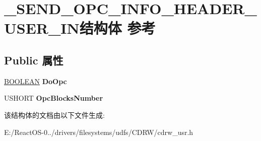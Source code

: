 \hypertarget{struct___s_e_n_d___o_p_c___i_n_f_o___h_e_a_d_e_r___u_s_e_r___i_n}{}\section{\+\_\+\+S\+E\+N\+D\+\_\+\+O\+P\+C\+\_\+\+I\+N\+F\+O\+\_\+\+H\+E\+A\+D\+E\+R\+\_\+\+U\+S\+E\+R\+\_\+\+I\+N结构体 参考}
\label{struct___s_e_n_d___o_p_c___i_n_f_o___h_e_a_d_e_r___u_s_e_r___i_n}
\subsection*{Public 属性}
\begin{DoxyCompactItemize}
\item 
\mbox{\label{struct___s_e_n_d___o_p_c___i_n_f_o___h_e_a_d_e_r___u_s_e_r___i_n_af9e8914b6ea889fdde4a1f03b2f957a3}} 
\hyperlink{_processor_bind_8h_a112e3146cb38b6ee95e64d85842e380a}{B\+O\+O\+L\+E\+AN} {\bfseries Do\+Opc}
\item 
\mbox{\label{struct___s_e_n_d___o_p_c___i_n_f_o___h_e_a_d_e_r___u_s_e_r___i_n_ac4a7e04fad6c379854cb6f25ec1c6852}} 
U\+S\+H\+O\+RT {\bfseries Opc\+Blocks\+Number}
\end{DoxyCompactItemize}


该结构体的文档由以下文件生成\+:\begin{DoxyCompactItemize}
\item 
E\+:/\+React\+O\+S-\/0../drivers/filesystems/udfs/\+C\+D\+R\+W/cdrw\+\_\+usr.\+h\end{DoxyCompactItemize}
